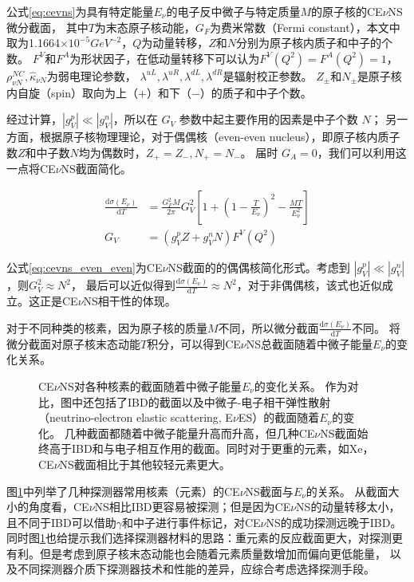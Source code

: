 公式\ref*{eq:cevns}为具有特定能量$E_{\nu}$的电子反中微子与特定质量$M$的原子核的CE$\nu$NS微分截面，
其中$T$为末态原子核动能，$G_F$为费米常数（Fermi constant），本文中取为1.1664$\times10^{-5}\si{GeV}^{-2}$，$Q$为动量转移，$Z$和$N$分别为原子核内质子和中子的个数。
$F^V$和$F^A$为形状因子，在低动量转移下可以认为$F^V(Q^2)=F^A(Q^2)=1$\cite{lewin_review_1996}，
$\rho_{\nu N}^{NC},\hat{\kappa}_{\nu N}$为弱电理论参数，
$\lambda^{uL},\lambda^{uR},\lambda^{dL},\lambda^{dR}$是辐射校正参数\cite{barranco_probing_2005}。
$Z_{\pm}$和$N_{\pm}$是原子核内自旋（spin）取向为上（$+$）和下（$-$）的质子和中子个数。

经过计算，$|g_V^p|\ll|g_V^n|$，所以在 $G_V$ 参数中起主要作用的因素是中子个数 $N$；
另一方面，根据原子核物理理论，对于偶偶核（even-even nucleus），即原子核内质子数$Z$和中子数$N$均为偶数时，$Z_{+}=Z_{-},N_{+}=N_{-}$。
届时 $G_A=0$，我们可以利用这一点将CE$\nu$NS截面简化。

\begin{align}
    \label{eq:cevns_even_even}
    \frac{\mathrm{d}\sigma(E_\nu)}{\mathrm{d}T} &= \frac{G_F^2 M}{2\pi}G_V^2\left[1+(1-\frac{T}{E_{\nu}})^2-\frac{MT}{E_{\nu}^2}\right] \\
    G_V &= (g_V^p Z+g_V^n N)F^V(Q^2)
\end{align}

公式\ref{eq:cevns_even_even}为CE$\nu$NS截面的的偶偶核简化形式。考虑到 $|g_V^p|\ll|g_V^n|$，则$G_V^2\approx N^2$，
最后可以近似得到$\frac{\mathrm{d}\sigma(E_\nu)}{\mathrm{d}T}\approx N^2$，对于非偶偶核，该式也近似成立。这正是CE$\nu$NS相干性的体现。

对于不同种类的核素，因为原子核的质量$M$不同，所以微分截面$\frac{\mathrm{d}\sigma(E_\nu)}{\mathrm{d}T}$不同。
将微分截面对原子核末态动能$T$积分，可以得到CE$\nu$NS总截面随着中微子能量$E_{\nu}$的变化关系。

\begin{figure}
    \centering
    
    \caption{\label{fig:xsec_elements} CE$\nu$NS对各种核素的截面随着中微子能量$E_{\nu}$的变化关系。
    作为对比，图中还包括了IBD\cite{akimov_observation_2017}的截面以及中微子-电子相干弹性散射（neutrino-electron elastic scattering, E$\nu$ES）的截面随着$E_{\nu}$的变化。
    几种截面都随着中微子能量升高而升高，但几种CE$\nu$NS截面始终高于IBD和与电子相互作用的截面。同时对于更重的元素，如$\mathrm{Xe}$，CE$\nu$NS截面相比于其他较轻元素更大。}
\end{figure}

图\ref{fig:xsec_elements}中列举了几种探测器常用核素（元素）的CE$\nu$NS截面与$E_{\nu}$的关系。
从截面大小的角度看，CE$\nu$NS相比IBD更容易被探测；但是因为CE$\nu$NS的动量转移太小，且不同于IBD可以借助$\gamma$和中子进行事件标记，对CE$\nu$NS的成功探测远晚于IBD。
同时图\ref{fig:xsec_elements}也给提示我们选择探测器材料的思路：重元素的反应截面更大，对探测更有利。但是考虑到原子核末态动能也会随着元素质量数增加而偏向更低能量，
以及不同探测器介质下探测器技术和性能的差异，应综合考虑选择探测手段。

